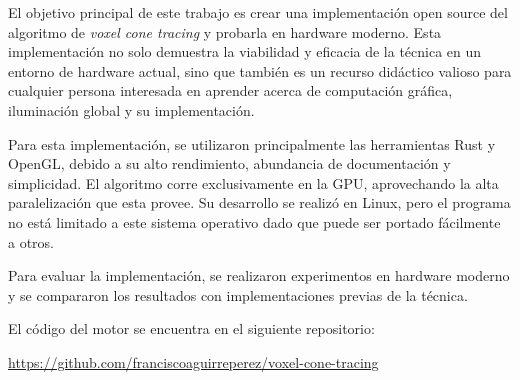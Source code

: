 \documentclass{prgrado}
\begin{document}
El objetivo principal de este trabajo es crear una implementación open source del algoritmo de \textit{voxel cone tracing} y probarla en hardware moderno. Esta implementación no solo demuestra la viabilidad y eficacia de la técnica en un entorno de hardware actual, sino que también es un recurso didáctico valioso para cualquier persona interesada en aprender acerca de computación gráfica, iluminación global y su implementación.

Para esta implementación, se utilizaron principalmente las herramientas Rust y OpenGL, debido a su alto rendimiento, abundancia de documentación y simplicidad.
El algoritmo corre exclusivamente en la GPU, aprovechando la alta paralelización que esta provee.
Su desarrollo se realizó en Linux, pero el programa no está limitado a este sistema operativo dado que puede ser portado fácilmente a otros.

Para evaluar la implementación, se realizaron experimentos en hardware moderno y se compararon los resultados con implementaciones previas de la técnica.

El código del motor se encuentra en el siguiente repositorio:

\url{https://github.com/franciscoaguirreperez/voxel-cone-tracing}

\hfill \break
{}


\tableofcontents
\newpage



\mainmatter %













\backmatter %


\newpage

\printbibliography



\begin{appendix}



\end{appendix}

\end{document}
